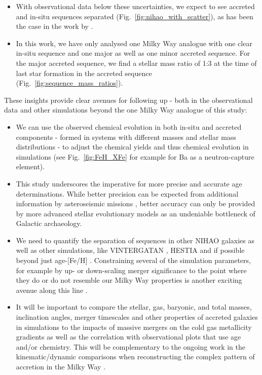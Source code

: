 \documentclass[fleqn,usenatbib]{mnras}
\begin{document}
\begin{itemize}
    \item With observational data below these uncertainties, we expect to see accreted and in-situ sequences separated (Fig.~\ref{fig:nihao_with_scatter}), as has been the case in the work by \citet{Xiang2022}.
    \item In this work, we have only analysed one Milky Way analogue with one clear in-situ sequence and one major as well as one minor accreted sequence. For the major accreted sequence, we find a stellar mass ratio of 1:3 at the time of last star formation in the accreted sequence (Fig.~\ref{fig:sequence_mass_ratios}).
\end{itemize}

These insights provide clear avenues for following up - both in the observational data and other simulations beyond the one Milky Way analogue of this study:
\begin{itemize}
    \item We can use the observed chemical evolution in both in-situ and accreted components - formed in systems with different masses and stellar mass distributions - to adjust the chemical yields and thus chemical evolution in simulations (see Fig.~\ref{fig:FeH_XFe} for example for Ba as a neutron-capture element).
    \item This study underscores the imperative for more precise and accurate age determinations. While better precision can be expected from additional information by asteroseismic missions \citep[see e.g.][]{Miglio2017, Mackereth2021}, better accuracy can only be provided by more advanced stellar evolutionary models \citep[see also][]{Kim2002, Schuster2012} as an undeniable bottleneck of Galactic archaeology.
    \item We need to quantify the separation of sequences in other NIHAO galaxies \citep[see e.g.][]{Lu2022, Buck2023} as well as other simulations, like \textsc{VINTERGATAN} \citep{Renaud2021, Renaud2021b, Agertz2021}, \textsc{HESTIA} \citep{Khoperskov2023, Khoperskov2023b, Khoperskov2023c} and if possible beyond just age-[Fe/H] \citep{Khoperskov2023c}. Constraining several of the simulation parameters, for example by up- or down-scaling merger significance to the point where they do or do not resemble our Milky Way properties is another exciting avenue along this line \cite{Rey2023}.
    \item It will be important to compare the stellar, gas, baryonic, and total masses, inclination angles, merger timescales and other properties of accreted galaxies in simulations to the impacts of massive mergers on the cold gas metallicity gradients \citep{Buck2023} as well as the correlation with observational plots that use age and/or chemistry. This will be complementary to the ongoing work in the kinematic/dynamic comparisons \citep[e.g.][]{Naidu2021, Khoperskov2023b} when reconstructing the complex pattern of accretion in the Milky Way \citep{Naidu2020}.
\end{itemize}
\end{document}
